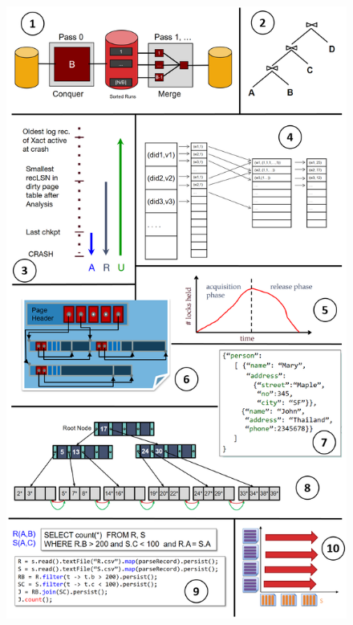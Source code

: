 \documentclass[10pt]{article}
\begin{document}
\begin{figure}
	\centering
	\includegraphics[width=.8\linewidth]{basics_new.png}
\end{figure}


\newpage
\end{document}
